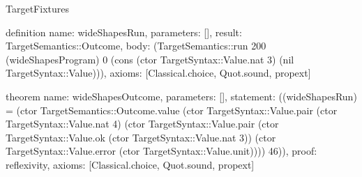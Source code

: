 \begin{lexlean}{TargetFixtures}
\begin{semanticmodule}
{}

definition{
  name: wideShapesRun,
  parameters: [],
  result: TargetSemantics::Outcome,
  body: (TargetSemantics::run 200 (wideShapesProgram) 0 (cons (ctor TargetSyntax::Value.nat 3) (nil TargetSyntax::Value))),
  axioms: [Classical.choice, Quot.sound, propext]
}

theorem{
  name: wideShapesOutcome,
  parameters: [],
  statement: ((wideShapesRun) = (ctor TargetSemantics::Outcome.value (ctor TargetSyntax::Value.pair (ctor TargetSyntax::Value.nat 4) (ctor TargetSyntax::Value.pair (ctor TargetSyntax::Value.ok (ctor TargetSyntax::Value.nat 3)) (ctor TargetSyntax::Value.error (ctor TargetSyntax::Value.unit)))) 46)),
  proof: reflexivity{},
  axioms: [Classical.choice, Quot.sound, propext]
}
\end{semanticmodule}
\end{lexlean}
